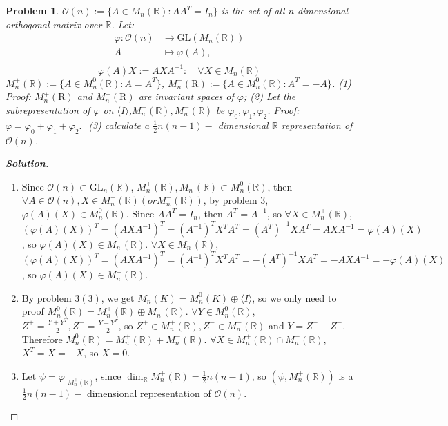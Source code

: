 \documentclass{ctexart}
\newtheorem{problem}{\textbf{Problem}}
\newenvironment{solution}{\begin{proof}[\textbf{Solution}]}{\end{proof}}
\renewcommand\phi{\varphi}
\renewcommand{\(}{\left(}
\renewcommand{\)}{\right)}
\newcommand{\R}{\mathbb{R}}
\renewcommand{\phi}{\varphi}
\newcommand{\GL}{\mathrm{GL}}
\newcommand{\calO}{\mathcal{O}}
\begin{document}
\begin{problem}
   $\calO(n):=\{A\in M_n(\R):AA^T=I_n\}$ is the set of all $n$-dimensional orthogonal matrix over $\R$. Let: 
   \begin{equation}
    \begin{aligned}
        \varphi: \calO(n) &\rightarrow \mathrm{GL}\left(M_n(\mathbb{R})\right) \\
        A &\mapsto \varphi(A), \\
    \end{aligned}
   \end{equation}
    \begin{equation}
 \varphi(A) X:=A X A^{-1}: \quad \forall X \in M_n(\mathbb{R}) 
    \end{equation}
 $M_n^{+}(\mathbb{R}):=\{A\in M_n^0(\R): A=A^T\}$, $M_n^{-}(\mathrm{R}):=\{A\in M_n^0(\R): A^T=-A\}$.
    (1) Proof: $M_n^{+}(\mathrm{R})$ and $M_n^{-}(\mathrm{R})$ are invariant spaces of $\varphi$;
    (2) Let the subrepresentation of $\varphi$ on $\langle I \rangle$,$ M_n^{+}(\mathbb{R}), M_n^{-}(\mathbb{R})$ be  $\varphi_0, \varphi_1, \varphi_2$. Proof:
    $
    \varphi=\varphi_0+\varphi_1+\varphi_2 \text {. }
    $
    (3) calculate a $\frac{1}{2} n(n-1)-$ dimensional $ \R$ representation of $\calO(n)$.
\end{problem}
\begin{solution}
\begin{enumerate}
    \item Since $\calO(n)\subset \GL_n(\R)$, $M_n^+(\R),M_n^-(\R)\subset M_n^0(\R)$, then $\forall A\in\calO(n) , X\in M_n^+(\R)(or M_n^-(\R))$, by problem 3,$\phi(A)(X)\in M_n^0(\R)$.
    Since $AA^T=I_n$, then $A^T=A^{-1}$, so
    $\forall X\in M^+_n(\R)$, $(\phi(A)(X))^T=(AXA^{-1})^T=(A^{-1})^TX^TA^T=(A^T)^{-1}XA^T=AXA^{-1}=\phi(A)(X)$, so $\phi(A)(X)\in M_n^+(\R)$. 
    $\forall X\in M^-_n(\R)$, 
    $(\phi(A)(X))^T=(AXA^{-1})^T=(A^{-1})^TX^TA^T=-(A^T)^{-1}XA^T=-AXA^{-1}=-\phi(A)(X)$, so $\phi(A)(X)\in M_n^-(\R)$. 
\item By problem $3(3)$, we get $M_n(K)=M_n^0(K)\oplus\langle I\rangle$, so we only need to proof $M_n^0(\R)=M_n^+(\R)\oplus M_n^-(\R)$. $\forall Y\in M_n^0(\R)$, $Z^+=\frac{Y+Y^T}{2},Z^-=\frac{Y-Y^T}{2}$, so $Z^+\in M_n^+(\R),Z^-\in M_n^-(\R)$ and $Y=Z^++Z^-$. 
Therefore $M_n^0(\R)=M_n^+(\R)+ M_n^-(\R)$.
$\forall X\in M_n^+(\R)\cap M_n^-(\R)$, $X^T=X=-X$, so $X=0$.
\item Let $\psi=\phi|_{M_n^+(\R)}$, since $\dim_{\R}M_n^+(\R)=\frac{1}{2}n(n-1)$, so $(\psi, M_n^+(\R))$ is a $\frac{1}{2}n(n-1)-$ dimensional representation of $\calO(n)$.
\end{enumerate}
\end{solution}
\end{document}
